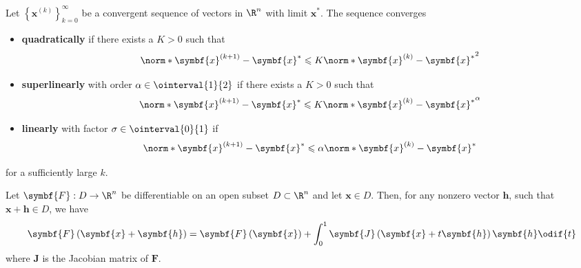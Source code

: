 \documentclass{article}
\begin{document}
\begin{definition}
    Let \(\left\{ \symbf{x}^{\left( k \right)} \right\}_{k = 0}^\infty\)
    be a convergent sequence of vectors in \(\R^n\) with limit \(\symbf{x}^\ast\).
    The sequence converges
    \begin{itemize}
        \item \textbf{quadratically} if there exists a \(K > 0\) such that
              \begin{equation*}
                  \norm*{\symbf{x}^{\left( k+1 \right)} - \symbf{x}^\ast} \leqslant K \norm*{\symbf{x}^{\left( k \right)} - \symbf{x}^\ast}^2
              \end{equation*}
        \item \textbf{superlinearly} with order \(\alpha \in \ointerval{1}{2}\) if there exists a \(K > 0\) such that
              \begin{equation*}
                  \norm*{\symbf{x}^{\left( k+1 \right)} - \symbf{x}^\ast} \leqslant K \norm*{\symbf{x}^{\left( k \right)} - \symbf{x}^\ast}^\alpha
              \end{equation*}
        \item \textbf{linearly} with factor \(\sigma \in \ointerval{0}{1}\) if
              \begin{equation*}
                  \norm*{\symbf{x}^{\left( k+1 \right)} - \symbf{x}^\ast} \leqslant \alpha \norm*{\symbf{x}^{\left( k \right)} - \symbf{x}^\ast}
              \end{equation*}
    \end{itemize}
    for a sufficiently large \(k\).
\end{definition}
\begin{theorem}
    Let \(\symbf{F} :  D \to \R^n\) be differentiable on an open subset
    \(D \subset \R^n\) and let \(\symbf{x} \in D\). Then, for any nonzero
    vector \(\symbf{h}\), such that \(\symbf{x} + \symbf{h} \in D\), we
    have
    \begin{equation*}
        \symbf{F}\left( \symbf{x} + \symbf{h} \right) = \symbf{F}\left( \symbf{x} \right) + \int_0^1 \symbf{J}\left( \symbf{x} + t \symbf{h} \right) \symbf{h} \odif{t}
    \end{equation*}
    where \(\symbf{J}\) is the Jacobian matrix of \(\symbf{F}\).
\end{theorem}
\end{document}
